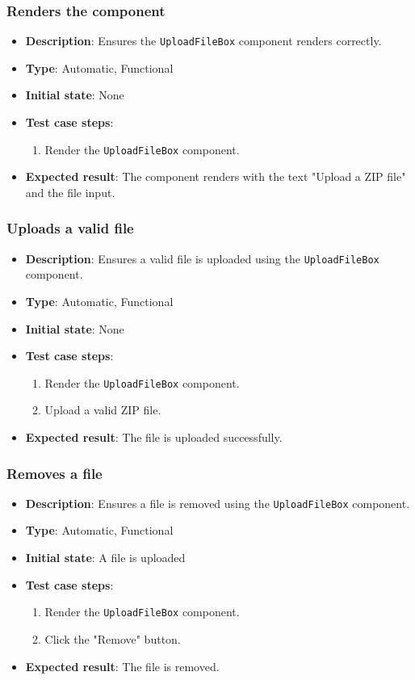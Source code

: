 \documentclass[12pt, titlepage]{article}
\begin{document}
\subsubsection{Renders the component}
\begin{itemize}
    \item \textbf{Description}: Ensures the \texttt{UploadFileBox} component renders correctly.
    \item \textbf{Type}: Automatic, Functional
    \item \textbf{Initial state}: None
    \item \textbf{Test case steps}:
    \begin{enumerate}
        \item Render the \texttt{UploadFileBox} component.
    \end{enumerate}
    \item \textbf{Expected result}: The component renders with the text "Upload a ZIP file" and the file input.
\end{itemize}

\subsubsection{Uploads a valid file}
\begin{itemize}
    \item \textbf{Description}: Ensures a valid file is uploaded using the \texttt{UploadFileBox} component.
    \item \textbf{Type}: Automatic, Functional
    \item \textbf{Initial state}: None
    \item \textbf{Test case steps}:
    \begin{enumerate}
        \item Render the \texttt{UploadFileBox} component.
        \item Upload a valid ZIP file.
    \end{enumerate}
    \item \textbf{Expected result}: The file is uploaded successfully.
\end{itemize}

\subsubsection{Removes a file}
\begin{itemize}
    \item \textbf{Description}: Ensures a file is removed using the \texttt{UploadFileBox} component.
    \item \textbf{Type}: Automatic, Functional
    \item \textbf{Initial state}: A file is uploaded
    \item \textbf{Test case steps}:
    \begin{enumerate}
        \item Render the \texttt{UploadFileBox} component.
        \item Click the "Remove" button.
    \end{enumerate}
    \item \textbf{Expected result}: The file is removed.
\end{itemize}
\end{document}
